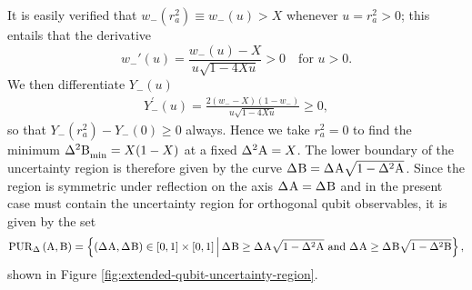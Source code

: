 It is easily verified that $w_-(r_a^2)\equiv w_-(u)>X$ whenever $u=r_a^2>0$; this entails that the derivative 
\begin{equation}\label{eq:w_->X}
w_-'(u)=\frac{w_-(u)-X}{u\sqrt{1-4Xu}}>0\quad\text{for }u>0.
\end{equation}
We then differentiate $Y_-(u)$
\begin{align}
  Y_-^\prime(u) = \frac{2(w_--X)(1-w_-)}{u\sqrt{1-4Xu}}\ge 0,
\end{align}
so that $Y_-(r_a^2) - Y_-(0)\ge 0$ always.
Hence we  take $r_a^2 = 0$ to find the minimum $\varmin{\opb}=X(1-X)$ at a fixed $\var{\opa}=X$. The lower boundary of the uncertainty region is therefore given by the curve $\sdev{\opb} = \sdev{\opa}\sqrt{1-\var{\opa}}$. Since the region is symmetric under reflection on the axis $\sdev\opa=\sdev\opb$ and in the present case must contain the uncertainty region for orthogonal qubit observables, it is given by the set
\begin{align}
  \PUR{\Delta}{\opa}{\opb} = \left\{(\sdev{\opa},\sdev{\opb})\in [0,1]\times[0,1]\, \middle|\, \sdev{\opb} \geq \sdev{\opa}\sqrt{1-\var{\opa}} \text{ and } \sdev{\opa} \geq \sdev{\opb}\sqrt{1-\var{\opb}}  \right\},%
\end{align}
shown in Figure \ref{fig:extended-qubit-uncertainty-region}.

